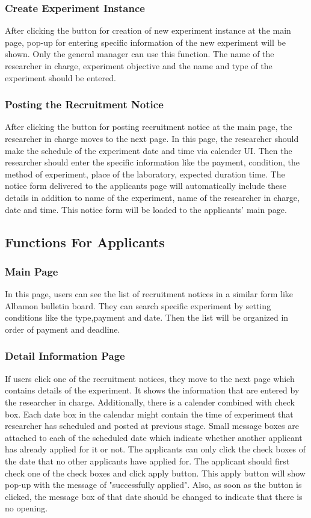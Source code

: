 \documentclass[letterpaper, 10 pt, conference]{ieeeconf}  %
\begin{document}
\subsubsection{Create Experiment Instance}
After clicking the button for creation of new experiment instance at the main page, pop-up for entering specific information of the new experiment will be shown. Only the general manager can use this function. The name of the researcher in charge, experiment objective and the name and type of the experiment should be entered. 
\subsubsection{Posting the Recruitment Notice}
After clicking the button for posting recruitment notice at the main page, the researcher in charge moves to the next page. In this page, the researcher should make the schedule of the experiment date and time via calender UI. Then the researcher should enter the specific information like the payment, condition, the method of experiment, place of the laboratory, expected duration time. The notice form delivered to the applicants page will automatically include these details in addition to name of the experiment, name of the researcher in charge, date and time. This notice form will be loaded to the applicants' main page.

\subsection{Functions For Applicants}
\subsubsection{Main Page}
In this page, users can see the list of recruitment notices in a similar form like Albamon bulletin board. They can search specific experiment by setting conditions like the type,payment and date. Then the list will be organized in order of payment and deadline.
\subsubsection{Detail Information Page}
If users click one of the recruitment notices, they move to the next page which contains details of the experiment. It shows the information that are entered by the researcher in charge. Additionally, there is a calender combined with check box. Each date box in the calendar might contain the time of experiment that researcher has scheduled and posted at previous stage. Small message boxes are attached to each of the scheduled date which indicate whether another applicant has already applied for it or not. The applicants can only click the check boxes of the date that no other applicants have applied for. The applicant should first check one of the check boxes and click apply button. This apply button will show pop-up with the message of "successfully applied". Also, as soon as the button is clicked, the message box of that date should be changed to indicate that there is no opening.
\end{document}
